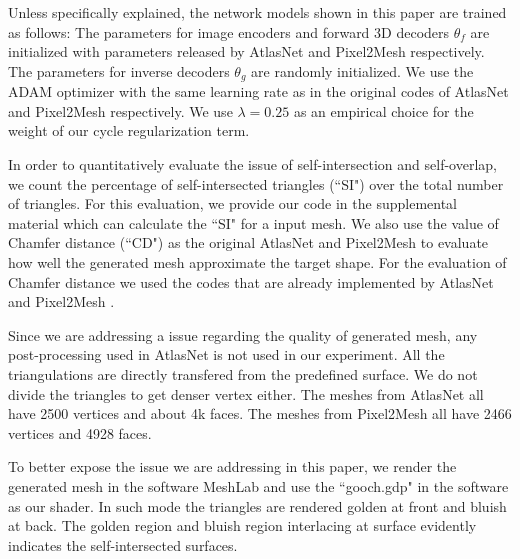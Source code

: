 Unless specifically explained, the network models shown in this paper are trained as follows: The parameters for image encoders and forward 3D decoders $\theta_f$ are initialized with parameters released by AtlasNet \cite{atlasnet} and Pixel2Mesh \cite{pixel2mesh} respectively. The parameters for inverse decoders $\theta_g$ are randomly initialized. We use the ADAM \cite{adam} optimizer with the same learning rate as in the original codes of AtlasNet and Pixel2Mesh respectively. We use $\lambda=0.25$ as an empirical choice for the weight of our cycle regularization term.

In order to quantitatively evaluate the issue of self-intersection and self-overlap, we count the percentage of self-intersected triangles (``SI") over the total number of triangles. For this evaluation, we provide our code in the supplemental material which can calculate the ``SI" for a input mesh.  
We also use the value of Chamfer distance (``CD") as the original AtlasNet and Pixel2Mesh to evaluate how well the generated mesh approximate the target shape. For the evaluation of Chamfer distance we used the codes that are already implemented by AtlasNet \cite{atlasnet} and Pixel2Mesh \cite{pixel2mesh}.

 Since we are addressing a issue regarding the quality of generated mesh, any post-processing used in AtlasNet \cite{atlasnet} is not used in our experiment. All the triangulations are directly transfered from the predefined surface. We do not divide the triangles to get denser vertex either. The meshes from AtlasNet all have 2500 vertices and about 4k faces. The meshes from Pixel2Mesh all have 2466 vertices and 4928 faces.

To better expose the issue we are addressing in this paper, we render the generated mesh in the software MeshLab and use the ``gooch.gdp" in the software as our shader. In such mode the triangles are rendered golden at front and bluish at back. The golden region and bluish region interlacing at surface evidently indicates the self-intersected surfaces.

